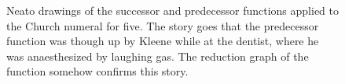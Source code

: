 \begin{figure}[htbp]
	\caption[The successor and predecessor function.]
	{Neato drawings of the successor and predecessor functions applied
	to the Church numeral for five. The story goes that the predecessor function 
	was though up by Kleene while at the dentist, where he was anaesthesized by laughing gas. 
	The reduction graph of the function somehow confirms this story.}
	\label{fig:images_Succ5_NEATO}
\end{figure}


\begin{figure}[htbp]
	\centering

\end{figure}
